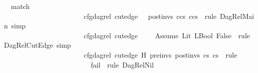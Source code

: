 \begin{isabellebody}
\ \ {\isacharparenleft}{\kern0pt}match\ \ \ \ \ \ \ \ \ \ \ \ \ \ \ \ \ \ \ \ \ \ \ \ \ \isanewline
\ \ \ \ \ \ \ \ \ \ \ \ \ \ \ \ \ \ \ \ \ \ \ {\isachardoublequoteopen}cfg{\isacharunderscore}{\kern0pt}dag{\isacharunderscore}{\kern0pt}rel\ {\isacharquery}{\kern0pt}cut{\isacharunderscore}{\kern0pt}edge\ {\isacharbrackleft}{\kern0pt}{\isacharbrackright}{\kern0pt}\ {\isacharbrackleft}{\kern0pt}{\isacharbrackright}{\kern0pt}\ {\isacharquery}{\kern0pt}post{\isacharunderscore}{\kern0pt}invs\ {\isacharparenleft}{\kern0pt}{\isacharquery}{\kern0pt}c{\isacharhash}{\kern0pt}{\isacharquery}{\kern0pt}cs{}{\isacharparenright}{\kern0pt}\ {\isacharparenleft}{\kern0pt}{\isacharquery}{\kern0pt}c{\isacharhash}{\kern0pt}{\isacharquery}{\kern0pt}cs{}{\isacharparenright}{\kern0pt}{\isachardoublequoteclose}\ {\isasymRightarrow}\ {\isacartoucheopen}rule\ DagRel{\isacharunderscore}{\kern0pt}Main{\isacharcomma}{\kern0pt}\ simp{\isacartoucheclose}\ {\isasymbar}\isanewline
\ \ \ \ \ \ \ \ \ \ \ \ \ \ \ \ \ \ \ \ \ \ \ {\isachardoublequoteopen}cfg{\isacharunderscore}{\kern0pt}dag{\isacharunderscore}{\kern0pt}rel\ {\isacharquery}{\kern0pt}cut{\isacharunderscore}{\kern0pt}edge\ {\isacharbrackleft}{\kern0pt}{\isacharbrackright}{\kern0pt}\ {\isacharbrackleft}{\kern0pt}{\isacharbrackright}{\kern0pt}\ {\isacharbrackleft}{\kern0pt}{\isacharbrackright}{\kern0pt}\ {\isacharbrackleft}{\kern0pt}{\isacharbrackright}{\kern0pt}\ {\isacharbrackleft}{\kern0pt}Assume\ {\isacharparenleft}{\kern0pt}Lit\ {\isacharparenleft}{\kern0pt}LBool\ False{\isacharparenright}{\kern0pt}{\isacharparenright}{\kern0pt}{\isacharbrackright}{\kern0pt}{\isachardoublequoteclose}\ {\isasymRightarrow}\ {\isacartoucheopen}rule\ DagRel{\isacharunderscore}{\kern0pt}CutEdge{\isacharcomma}{\kern0pt}\ simp{\isacartoucheclose}\ {\isasymbar}\isanewline
\ \ \ \ \ \ \ \ \ \ \ \ \ \ \ \ \ \ \ \ \ \ \ {\isachardoublequoteopen}cfg{\isacharunderscore}{\kern0pt}dag{\isacharunderscore}{\kern0pt}rel\ {\isacharquery}{\kern0pt}cut{\isacharunderscore}{\kern0pt}edge\ {\isacharquery}{\kern0pt}H\ {\isacharquery}{\kern0pt}pre{\isacharunderscore}{\kern0pt}invs\ {\isacharquery}{\kern0pt}post{\isacharunderscore}{\kern0pt}invs\ {\isacharquery}{\kern0pt}cs{}\ {\isacharquery}{\kern0pt}cs{}{\isachardoublequoteclose}\ {\isasymRightarrow}\ {\isacartoucheopen}rule{\isacartoucheclose}\ {\isasymbar}\isanewline
\ \ \ \ \ \ \ \ \ \ \ \ \ \ \ \ \ \ \ \ \ \ \ {\isachardoublequoteopen}{\isacharunderscore}{\kern0pt}{\isachardoublequoteclose}\ {\isasymRightarrow}\ fail{\isacharparenright}{\kern0pt}\ {\isacharbar}{\kern0pt}\ {\isacharparenleft}{\kern0pt}rule\ DagRel{\isacharunderscore}{\kern0pt}Nil{\isacharparenright}{\kern0pt}\isanewline

\end{isabellebody}
